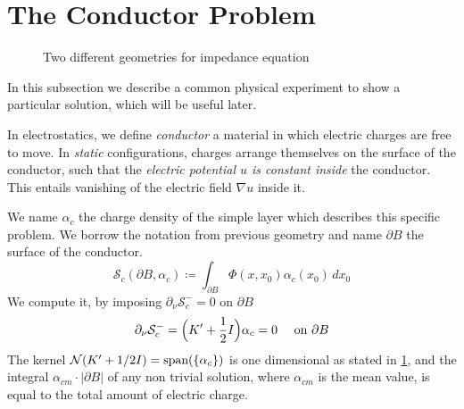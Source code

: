 \documentclass[10pt, a4paper, twoside, openright]{book}
\theoremstyle{definition}
\theoremstyle{plain}
\theoremstyle{plain}
\theoremstyle{plain}
\theoremstyle{plain}
\theoremstyle{plain}
\theoremstyle{plain}
\theoremstyle{plain}
\theoremstyle{plain}
\begin{document}
\section{The Conductor Problem}
\begin{figure}
\centering
{}
\caption{Two different geometries for impedance equation}
\label{fig:subfig}
\end{figure}
In this subsection we describe a common physical experiment to show a particular solution, which will be useful later.
\par
In electrostatics, we define \emph{conductor} a material in which electric charges are free to move. In \emph{static} configurations,
charges arrange themselves on the surface of the conductor, such that the \emph{electric potential $u$ is constant inside} the conductor. This entails vanishing of the electric field $\nabla u$ inside it.
\par
We name $\alpha_{c}$ the charge density of the simple layer which describes this specific problem. We borrow the notation from previous geometry and name $\partial B$ the surface of the conductor.
\begin{equation}
 \mathcal{S}_{c}(\partial B, \alpha_c)\coloneqq\int_{\partial B}\Phi(x,x_0)\alpha_{c}(x_0)\,dx_0
\end{equation}
We compute it, by imposing $\partial_\nu \mathcal{S}_{c}^- = 0$ on $\partial B$
\begin{equation}
 \partial_\nu\mathcal{S}_{c}^-=\Bigl(K'+\dfrac{1}{2}I\Bigr)\alpha_{c}= 0\quad\textup{ on }\partial B
\end{equation}
The kernel $\mathcal{N}(K' + 1/2 I)=\textup{span}(\{\alpha_{c}\})$ is one dimensional as stated in \ref{}, and the integral $\alpha_{cm} \cdot|\partial B|$ of any non trivial solution, where $\alpha_{cm}$ is the mean value, is equal to the total amount of electric charge.
\end{document}
